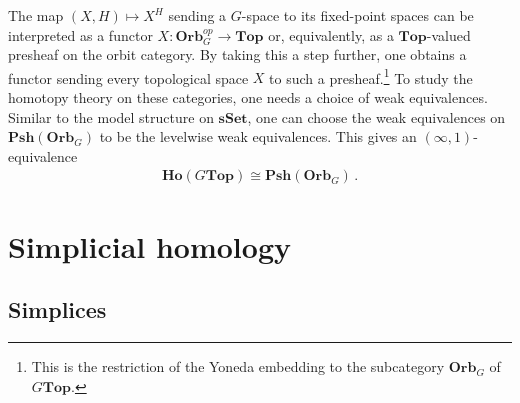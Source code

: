     \begin{theorem}[Elmendorf]
        The map $(X,H)\mapsto X^H$ sending a $G$-space to its fixed-point spaces can be interpreted as a functor $X:\mathbf{Orb}_G^{op}\rightarrow\mathbf{Top}$ or, equivalently, as a $\mathbf{Top}$-valued presheaf on the orbit category. By taking this a step further, one obtains a functor sending every topological space $X$ to such a presheaf.\footnote{This is the restriction of the Yoneda embedding to the subcategory $\mathbf{Orb}_G$ of $G\mathbf{Top}$.} To study the homotopy theory on these categories, one needs a choice of weak equivalences. Similar to the model structure on $\mathbf{sSet}$, one can choose the weak equivalences on $\mathbf{Psh}(\mathbf{Orb}_G)$ to be the levelwise weak equivalences. This gives an $(\infty,1)$-equivalence
        \begin{gather}
            \mathbf{Ho}(G\mathbf{Top})\cong\mathbf{Psh}(\mathbf{Orb}_G)\,.
        \end{gather}
    \end{theorem}


\section{Simplicial homology}\label{section:homology}
\subsection{Simplices}

